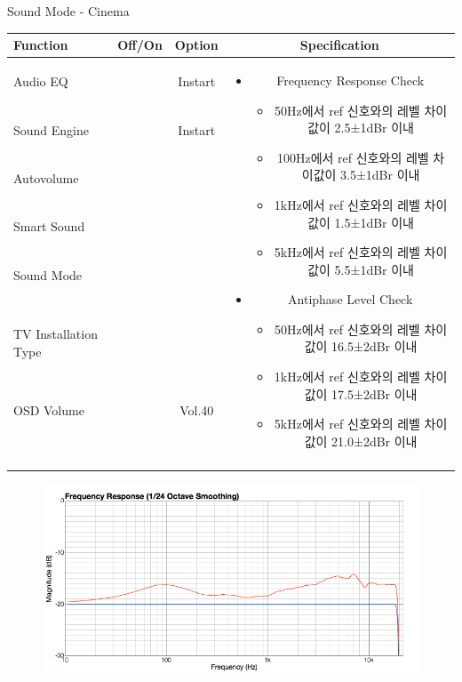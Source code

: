 \begin{frame}[t]{Sound Mode - Cinema}
\begin{tiny}
\begin{tabular}{@{}lccc@{}}
\toprule
Function & Off/On & Option & Specification \\
\midrule
Audio EQ & \color{black}{Off} & Instart &
\multirow{10}{60mm}{
\begin{itemize}
\item Frequency Response Check
	\begin{itemize}
	\item 50Hz에서 ref 신호와의 레벨 차이값이 2.5±1dBr 이내
	\item 100Hz에서 ref 신호와의 레벨 차이값이 3.5±1dBr 이내
	\item 1kHz에서 ref 신호와의 레벨 차이값이 1.5±1dBr 이내
	\item 5kHz에서 ref 신호와의 레벨 차이값이 5.5±1dBr 이내
	\end{itemize}
\item Antiphase Level Check
	\begin{itemize}
	\item 50Hz에서 ref 신호와의 레벨 차이값이 16.5±2dBr 이내
	\item 1kHz에서 ref 신호와의 레벨 차이값이 17.5±2dBr 이내
	\item 5kHz에서 ref 신호와의 레벨 차이값이 21.0±2dBr 이내
	\end{itemize}
\end{itemize}
} \\
Sound Engine & \color{blue}{On} & Instart & \\
Autovolume & \color{black}{Off} & & \\
Smart Sound & \color{black}{Off} & & \\
Sound Mode & \color{blue}{On} & \color{blue}{Cinema} & \\
TV Installation Type & \color{blue}{On} & \color{black}{Standtype1} & \\
OSD Volume & \color{blue}{On} & Vol.40 & \\
& & & \\
& & & \\
& & & \\
& & & \\\midrule
\end{tabular}
\end{tiny}

\begin{figure}[b]
\includegraphics[height=0.4\textwidth]{figures/cinema.png}
\end{figure}

\end{frame}